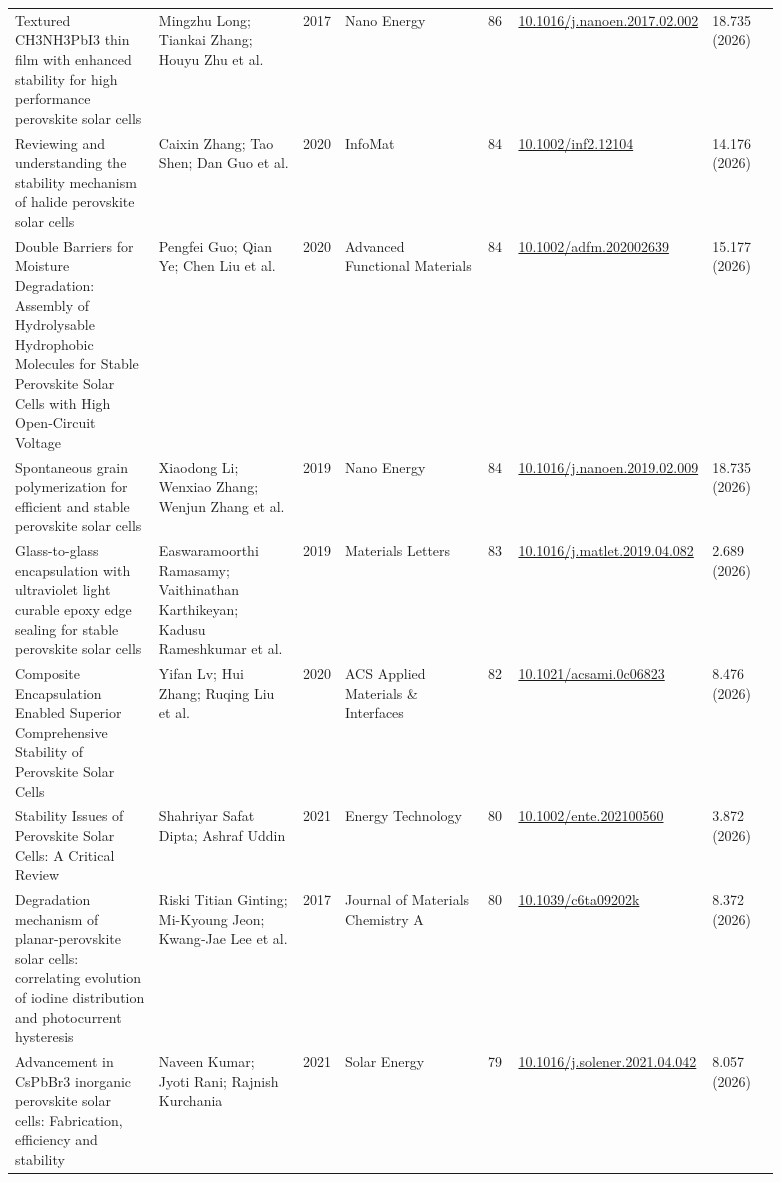 \documentclass[10pt,a4paper]{article}
\begin{document}
{\begin{longtable}{p{0.197\linewidth}p{0.197\linewidth}p{0.043\linewidth}p{0.197\linewidth}p{0.043\linewidth}p{0.117\linewidth}p{0.098\linewidth}}
Textured CH3NH3PbI3 thin film with enhanced stability for high performance perovskite solar cells & Mingzhu Long; Tiankai Zhang; Houyu Zhu et al. & 2017 & Nano Energy & 86 & \href{https://doi.org/10.1016/j.nanoen.2017.02.002}{10.1016/j.nanoen.2017.02.002} & 18.735 (2026) \\
Reviewing and understanding the stability mechanism of halide perovskite solar cells & Caixin Zhang; Tao Shen; Dan Guo et al. & 2020 & InfoMat & 84 & \href{https://doi.org/10.1002/inf2.12104}{10.1002/inf2.12104} & 14.176 (2026) \\
Double Barriers for Moisture Degradation: Assembly of Hydrolysable Hydrophobic Molecules for Stable Perovskite Solar Cells with High Open‐Circuit Voltage & Pengfei Guo; Qian Ye; Chen Liu et al. & 2020 & Advanced Functional Materials & 84 & \href{https://doi.org/10.1002/adfm.202002639}{10.1002/adfm.202002639} & 15.177 (2026) \\
Spontaneous grain polymerization for efficient and stable perovskite solar cells & Xiaodong Li; Wenxiao Zhang; Wenjun Zhang et al. & 2019 & Nano Energy & 84 & \href{https://doi.org/10.1016/j.nanoen.2019.02.009}{10.1016/j.nanoen.2019.02.009} & 18.735 (2026) \\
Glass-to-glass encapsulation with ultraviolet light curable epoxy edge sealing for stable perovskite solar cells & Easwaramoorthi Ramasamy; Vaithinathan Karthikeyan; Kadusu Rameshkumar et al. & 2019 & Materials Letters & 83 & \href{https://doi.org/10.1016/j.matlet.2019.04.082}{10.1016/j.matlet.2019.04.082} & 2.689 (2026) \\
Composite Encapsulation Enabled Superior Comprehensive Stability of Perovskite Solar Cells & Yifan Lv; Hui Zhang; Ruqing Liu et al. & 2020 & ACS Applied Materials \& Interfaces & 82 & \href{https://doi.org/10.1021/acsami.0c06823}{10.1021/acsami.0c06823} & 8.476 (2026) \\
Stability Issues of Perovskite Solar Cells: A Critical Review & Shahriyar Safat Dipta; Ashraf Uddin & 2021 & Energy Technology & 80 & \href{https://doi.org/10.1002/ente.202100560}{10.1002/ente.202100560} & 3.872 (2026) \\
Degradation mechanism of planar-perovskite solar cells: correlating evolution of iodine distribution and photocurrent hysteresis & Riski Titian Ginting; Mi-Kyoung Jeon; Kwang‐Jae Lee et al. & 2017 & Journal of Materials Chemistry A & 80 & \href{https://doi.org/10.1039/c6ta09202k}{10.1039/c6ta09202k} & 8.372 (2026) \\
Advancement in CsPbBr3 inorganic perovskite solar cells: Fabrication, efficiency and stability & Naveen Kumar; Jyoti Rani; Rajnish Kurchania & 2021 & Solar Energy & 79 & \href{https://doi.org/10.1016/j.solener.2021.04.042}{10.1016/j.solener.2021.04.042} & 8.057 (2026) \\

\end{longtable}}
\end{document}
